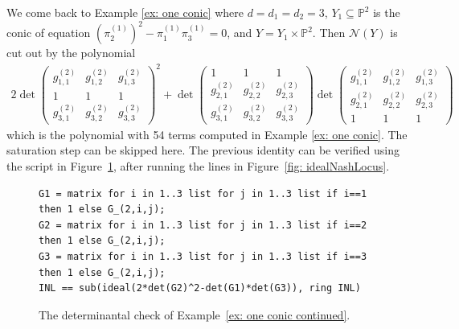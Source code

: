 \documentclass[12pt]{article}
\theoremstyle{definition}
\newenvironment{example}
{\pushQED{\qed}\renewcommand{\qedsymbol}{$\diamond$}\examplex}
{\popQED\endexamplex}
\newcommand{\PP}{{\mathbb P}}
\newcommand{\kn}{{\mathcal N}}
\begin{document}
\begin{example}\label{ex: one conic continued}
We come back to Example \ref{ex: one conic} where $d=d_1=d_2=3$, $Y_1\subseteq\PP^2$ is the conic of equation $(\pi_2^{(1)})^2-\pi_1^{(1)}\pi_3^{(1)}=0$, and $Y=Y_1\times\PP^2$. Then $\kn(Y)$ is cut out by the polynomial
\begin{align*}
2\det\begin{pmatrix}
g_{1,1}^{(2)} & g_{1,2}^{(2)} & g_{1,3}^{(2)}\\
1 & 1 & 1 \\
g_{3,1}^{(2)} & g_{3,2}^{(2)} & g_{3,3}^{(2)}
\end{pmatrix}^2+
\det\begin{pmatrix}
1 & 1 & 1 \\
g_{2,1}^{(2)} & g_{2,2}^{(2)} & g_{2,3}^{(2)}\\
g_{3,1}^{(2)} & g_{3,2}^{(2)} & g_{3,3}^{(2)}
\end{pmatrix}\det
\begin{pmatrix}
g_{1,1}^{(2)} & g_{1,2}^{(2)} & g_{1,3}^{(2)}\\
g_{2,1}^{(2)} & g_{2,2}^{(2)} & g_{2,3}^{(2)}\\
1 & 1 & 1
\end{pmatrix}
\end{align*}
which is the polynomial with 54 terms computed in Example \ref{ex: one conic}. The saturation step can be skipped here. The previous identity can be verified using the script in Figure~\ref{fig: idealNashLocus2}, after running the lines in Figure~\ref{fig: idealNashLocus}.
\end{example}
\begin{figure}[h]
\centering
\begin{tcolorbox}[size=fbox,width=\linewidth,colback=blue!5!white,colframe=blue!75!black]
\begin{Verbatim}[fontsize=\small,commandchars=\\\{\}]
G1 = matrix for i in 1..3 list for j in 1..3 list if i==1 then 1 else G_(2,i,j);
G2 = matrix for i in 1..3 list for j in 1..3 list if i==2 then 1 else G_(2,i,j);
G3 = matrix for i in 1..3 list for j in 1..3 list if i==3 then 1 else G_(2,i,j);
INL == sub(ideal(2*det(G2)^2-det(G1)*det(G3)), ring INL)
\end{Verbatim}
\end{tcolorbox}
\caption{The determinantal check of Example~\ref{ex: one conic continued}.}\label{fig: idealNashLocus2}
\end{figure}
\end{document}
